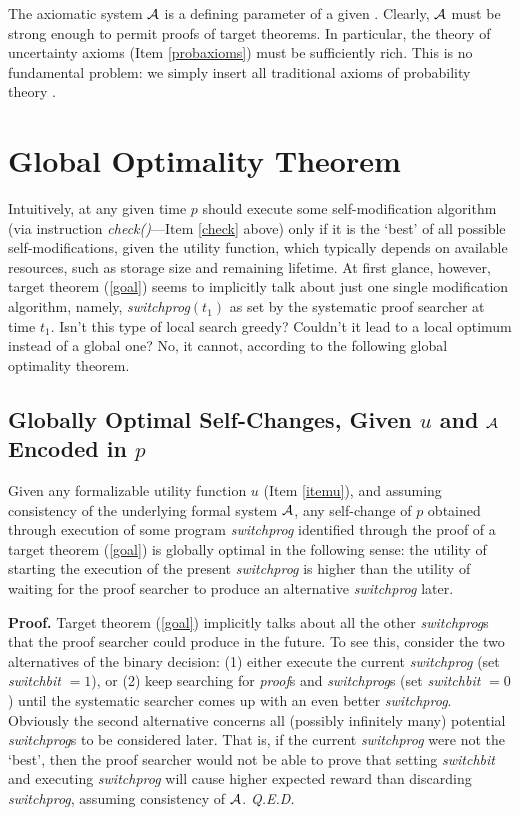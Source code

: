 The axiomatic system $\cal A$ is a defining
parameter of a given \gmn.  Clearly,  $\cal A$ must be
strong enough to permit proofs of target theorems.
In particular, the theory of uncertainty axioms
(Item \ref{probaxioms}) must be sufficiently rich.
This is no fundamental problem: we simply
insert all traditional axioms of probability theory \cite{Kolmogorov:33}.


\section{\bf Global Optimality Theorem}
\label{secglobopt}
 
 Intuitively, at any given time $p$ should
 execute some self-modification algorithm 
 (via instruction {\em check()}---Item \ref{check} above) 
 only if it is
 the `best' of all possible self-modifications,
 given the utility function, which typically
 depends on available resources, such as storage size and
 remaining lifetime.
 At first glance, however, target theorem (\ref{goal})
 seems to implicitly talk about just
 one single modification algorithm, namely, {\em switchprog}$(t_1)$
 as set by the systematic proof searcher at time $t_1$.
 Isn't this type of local search greedy? Couldn't
 it lead to a local optimum instead of a global one?
 No, it cannot, according to the following global optimality theorem.

\subsection{Globally Optimal Self-Changes, Given $u$ and $\cal A$ Encoded in $p$}
\label{sectheorem}
  
  \begin{theorem}
  \label{globopt}
  Given any formalizable utility function $u$ (Item \ref{itemu}),
  and assuming consistency of the underlying formal system $\cal A$,
  any self-change of $p$ obtained through execution of
  some program {\em switchprog} identified
  through the proof of a target theorem  (\ref{goal})
  is globally optimal in the following sense:
  the utility of starting the execution of the present
  {\em switchprog} is higher than the utility of
  waiting for the proof searcher
  to produce an alternative {\em switchprog} later.
  \end{theorem}


\noindent
{\bf Proof.} Target theorem  (\ref{goal})
implicitly talks about all the other
{\em switchprog}s that the proof searcher
could produce in the future. To see this, consider
the two alternatives of the binary decision:
(1) either execute the current {\em switchprog} (set {\em switchbit} $=1$), or
(2) keep searching for {\em proof}s and {\em switchprog}s (set {\em switchbit} $=0$)
until the systematic
searcher comes up with an even better {\em switchprog}.
Obviously the second alternative concerns all (possibly infinitely
many) potential {\em switchprog}s to be considered later.  That is,
if  the current {\em switchprog}  were not the `best', then
the proof searcher would not be able to prove that
setting {\em switchbit} and
executing  {\em switchprog} will cause higher expected reward
than discarding {\em switchprog}, assuming consistency of $\cal A$.
{\em Q.E.D.}

